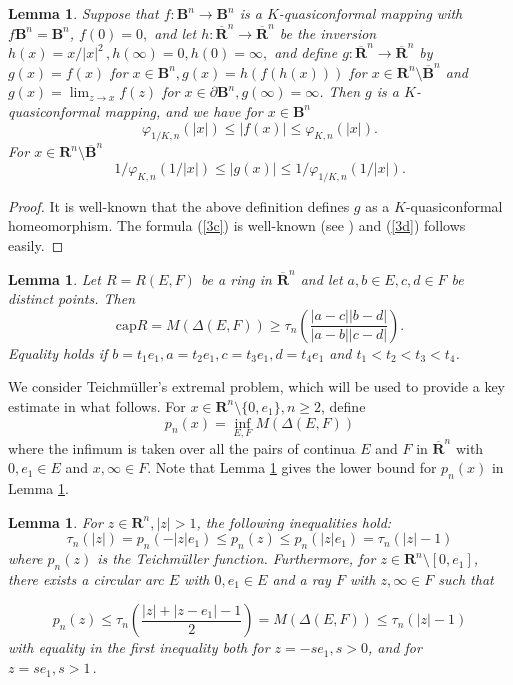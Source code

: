 \documentclass[12pt,a4paper,leqno]{amsart}
\theoremstyle{plain}
\newtheorem{lemma}[equation]{Lemma}
\numberwithin{equation}{section}          %
\begin{document}
\begin{lemma}\label{3b} Suppose that $f : \mathbf{B}^n\to\mathbf{B}^n$ is a $K$-quasiconformal mapping with
 $f\mathbf{B}^n=\mathbf{B}^n$, $f(0)=0,$ and let $h : \overline{\mathbf{R}}^n \to \overline{\mathbf{R}}^n$
 be the inversion $h(x) = x/|x|^2\,, h(\infty)=0, h(0)=\infty,$ and define
 $g:\overline{\mathbf{R}}^n\to\overline{\mathbf{R}}^n$
 by $g(x)=f(x)$ for $x\in \mathbf{B}^n, g(x)=h(f(h(x)))$ for $x\in\mathbf{R}^n\setminus
 \overline{\mathbf{B}}^n$ and $g(x)=\lim_{z\to x}f(z)$ for $x\in\partial\mathbf{B}^n,g(\infty)=\infty$.
 Then $g$ is a $K$-quasiconformal mapping, and we have for $x\in\mathbf{B}^n$
\begin{equation}\label{3c}
\varphi_{1/K,n}(|x|)\leq |f(x)|\leq\varphi_{K,n}(|x|).
\end{equation}
For $x\in\mathbf{R}^n\setminus\overline{\mathbf{B}}^n$
\begin{equation}\label{3d}
1/\varphi_{K,n}(1/|x|)\leq |g(x)|\leq1/\varphi_{1/K,n}(1/|x|).
\end{equation}
\end{lemma}
\begin{proof} It is well-known that the above definition defines $g$ as a $K$-quasiconformal
homeomorphism. The formula (\ref{3c}) is well-known (see \cite[Theorem 4.2]{avv}) and (\ref{3d}) follows easily.
\end{proof}

\begin{lemma}\label{4}\cite[Lemma 7.35]{vuobook}
Let $R=R(E,F)$ be a ring in $\overline{\mathbf{R}}^n$ and let $a,b\in E,c,d\in F$ be distinct points. Then
$$\text{cap}R=M(\Delta(E,F))\geq\tau_n\left(\frac{|a-c||b-d|}{|a-b||c-d|}\right).$$
Equality holds if $b=t_1e_1,a=t_2e_1,c=t_3e_1,d=t_4e_1$ and $t_1<t_2<t_3<t_4$.
\end{lemma}



We consider Teichm\"uller's extremal problem, which will be used to
provide a key estimate in what follows. For
$x\in\mathbf{R}^n\setminus\{0,e_1\}, n\geq 2$, define
$$p_n(x)=\inf_{E,F}M(\Delta(E,F))$$
where the infimum is taken over all the pairs of continua $E$ and
$F$ in $\overline{\mathbf{R}}^n$ with $0,e_1\in E$ and $x,\infty \in
F$. Note that Lemma \ref{4} gives the lower bound for $p_n(x)$
in Lemma \ref{5}.


\begin{lemma}\label{5}\cite[Theorem 3.20]{vu2}
For $z\in\mathbf{R}^n, |z|>1$, the following inequalities hold:
$$\tau_n(|z|)=p_n(-|z|e_1)\leq p_n(z)\leq p_n(|z|e_1)=\tau_n(|z|-1)$$
where $p_n(z)$ is the Teichm\"uller function. Furthermore, for
$z\in\mathbf{R}^n\setminus[0,e_1]$, there exists a circular arc $E$
with $0,e_1\in E$ and a ray $F$ with $z,\infty\in F$
such that

\begin{equation}\label{6}
p_n(z)\leq \tau_n\left(\frac{|z|+|z-e_1|-1}{2}\right)=M(\Delta(E,F))
\leq \tau_n(|z|-1)
\end{equation}
with equality in the first inequality both for $z=-se_1, s>0$, and for $z=se_1,s>1\,.$
\end{lemma}
\end{document}
